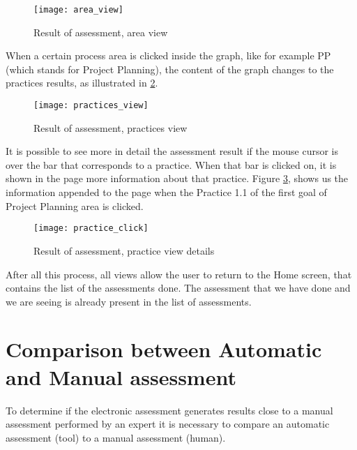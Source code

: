 \begin{figure}[h]
	\begin{center}
		\leavevmode
		\texttt{[image: area\_view]}
		\caption{Result of assessment, area view}
		\label{fig:area_view}
	\end{center}
\end{figure}

When a certain process area is clicked inside the graph, like for example PP (which stands for Project Planning), the content of the graph changes to the practices results, as illustrated in \ref{fig:practices_view}.


\begin{figure}[h]
	\begin{center}
		\leavevmode
		\texttt{[image: practices\_view]}
		\caption{Result of assessment, practices view}
		\label{fig:practices_view}
	\end{center}
\end{figure}

It is possible to see more in detail the assessment result if the mouse cursor is over the bar that corresponds to a practice. When that bar is clicked on, it is shown in the page more information about that practice. Figure \ref{fig:practice_click}, shows us the information appended to the page when the Practice 1.1 of the first goal of Project Planning area is clicked.

\begin{figure}[!htb]
	\begin{center}
		\leavevmode
		\texttt{[image: practice\_click]}
		\caption{Result of assessment, practice view details}
		\label{fig:practice_click}
	\end{center}
\end{figure}

After all this process, all views allow the user to return to the Home screen, that contains the list of the assessments done. The assessment that we have done and we are seeing is already present in the list of assessments.
 
\section{Comparison between Automatic and Manual assessment} \label{sec:automatic}

To determine if the electronic assessment generates results close to a manual assessment performed by an expert it is necessary to compare an automatic assessment (tool) to a manual assessment (human).

